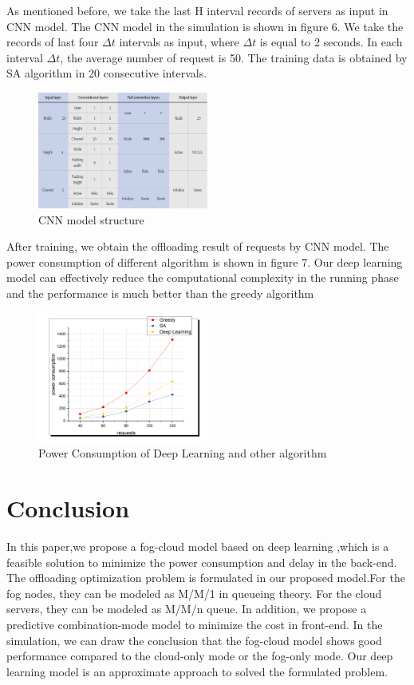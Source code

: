 \documentclass[journal]{IEEEtran}
\begin{document}
As mentioned before, we take the last H interval records of servers as input in CNN model. The CNN model in the simulation is shown in figure 6. We take the records of last four $\Delta t$ intervals as input, where $\Delta t$ is equal to 2 seconds. In each interval $\Delta t$, the average number of request is 50. The training data is obtained by SA algorithm in 20 consecutive intervals. 
\begin{figure}[htbp]
\includegraphics[width = 0.5\textwidth]{g.png}
\caption{CNN model structure}
\end{figure}

After training, we obtain the offloading result of requests by CNN model. The power consumption of different algorithm is shown in figure 7. Our deep learning model can effectively reduce the computational complexity in the running phase and the performance is much better than the greedy algorithm
\begin{figure}[htbp]
\includegraphics[width = 0.5\textwidth]{h.png}
\caption{Power Consumption of Deep Learning and other algorithm}
\end{figure}


\section{Conclusion}
In this paper,we propose a fog-cloud model based on deep learning ,which is a feasible solution to minimize the power consumption and delay in the back-end. The offloading optimization problem is formulated in our proposed model.For the fog nodes, they can be modeled as M/M/1 in queueing theory. For the cloud servers, they can be modeled as M/M/n queue. In addition, we propose a predictive combination-mode model to minimize the cost in front-end. In the simulation, we can draw the conclusion that the fog-cloud model shows good performance compared to the cloud-only mode or the fog-only mode. Our deep learning model is an approximate approach to solved the formulated problem.









\end{document}
